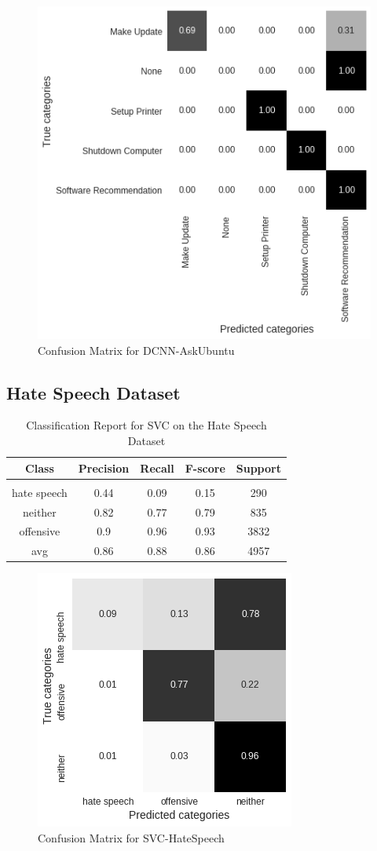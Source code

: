 \documentclass[11pt, oneside]{article}   	%
\begin{document}
\begin{figure}[h]
\centering
\includegraphics[width=0.6\linewidth]{DCNN-AskUbuntu}
\caption{Confusion Matrix for DCNN-AskUbuntu}
\label{fig:DCNN-AskUbuntu}
\end{figure}

\newpage
\subsection{Hate Speech Dataset}

\begin{table}[h]
\centering
\caption{Classification Report for SVC on the Hate Speech Dataset}
\begin{tabular}{c | c c c c}
Class & Precision & Recall & F-score & Support\\
\hline
\hline\\
hate speech & 0.44 & 0.09 & 0.15 & 290\\
neither & 0.82 & 0.77 & 0.79 & 835\\
offensive & 0.9 & 0.96 & 0.93 & 3832\\
avg & 0.86 & 0.88 & 0.86 & 4957\\
\end{tabular}
\end{table}

\begin{figure}[h]
\centering
\includegraphics[width=0.6\linewidth]{SVC-HateSpeech}
\caption{Confusion Matrix for SVC-HateSpeech}
\label{fig:SVC-HateSpeech}
\end{figure}
\end{document}
